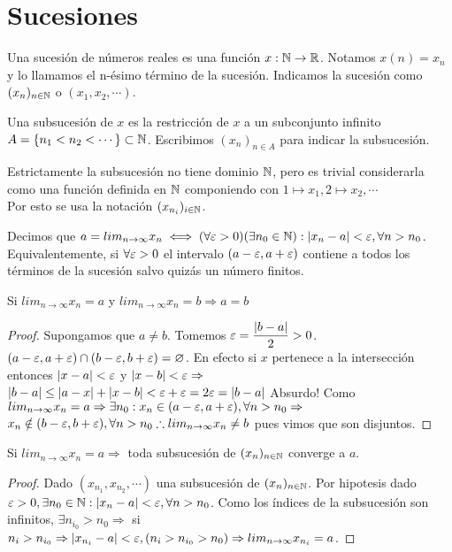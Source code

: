 \section{Sucesiones}

Una sucesión de números reales es una función $x: \mathbb{N} \to \mathbb{R}$. Notamos $x(n) = x_n$ y lo llamamos el n-ésimo término de la sucesión. Indicamos la sucesión como $(x_n)_{n \in \mathbb{N}}$ o $(x_1, x_2, \cdots)$.

Una subsucesión de $x$ es la restricción de $x$ a un subconjunto infinito $A = \{ n_1 < n_2 < \cdots \} \subset \mathbb{N}$. Escribimos $(x_n)_{n \in A}$ para indicar la subsucesión.

\begin{note}
  Estrictamente la subsucesión no tiene dominio $\mathbb{N}$, pero es trivial considerarla como una función definida en $\mathbb{N}$ componiendo con $1 \mapsto x_1, 2 \mapsto x_2, \cdots$ \\
  Por esto se usa la notación $(x_{n_i})_{i \in \mathbb{N}}$.
\end{note}

\begin{definition}
  Decimos que $a = lim_{n \to \infty} x_n \iff (\forall \varepsilon > 0)(\exists n_0 \in \mathbb{N}) : |x_n - a| < \varepsilon, \forall n > n_0$. \\
  Equivalentemente, si $\forall \varepsilon > 0$ el intervalo $(a-\varepsilon, a+\varepsilon)$ contiene a todos los términos de la sucesión salvo quizás un número finitos.
\end{definition}

\begin{theorem}
  Si $lim_{n \to \infty} x_n = a$ y $lim_{n \to \infty} x_n = b \Rightarrow a=b$
  \begin{proof}
    Supongamos que $a \neq b$. Tomemos $\varepsilon = \dfrac{|b-a|}{2} > 0$. \\
    $(a - \varepsilon, a+\varepsilon) \cap (b-\varepsilon, b+\varepsilon) = \varnothing$. En efecto si
    $x$ pertenece a la intersección entonces $|x-a| < \varepsilon$ y $|x-b| < \varepsilon \Rightarrow$ \\
    $|b-a| \leq |a-x| + |x-b| < \varepsilon + \varepsilon = 2 \varepsilon = |b-a|$ Absurdo!
    Como $lim_{n \to \infty} x_n = a \Rightarrow \exists n_0 : x_n \in (a - \varepsilon, a+ \varepsilon), \forall n > n_0 \Rightarrow$ \\
    $x_n \notin (b-\varepsilon, b+\varepsilon), \forall n > n_0 \therefore lim_{n \to \infty} x_n \neq b$ pues vimos que son disjuntos.
  \end{proof}
\end{theorem}

\begin{theorem}
  Si $lim_{n \to \infty} x_n = a \Rightarrow$ toda subsucesión de $(x_n)_{n \in \mathbb{N}}$ converge a $a$.

  \begin{proof}
    Dado $(x_{n_1}, x_{n_2}, \cdots)$ una subsucesión de $(x_n)_{n \in \mathbb{N}}$. Por hipotesis dado $\varepsilon > 0, \exists n_0 \in \mathbb{N} : |x_n - a| < \varepsilon, \forall n > n_0$. Como los índices de la subsucesión son infinitos, $\exists n_{i_0} > n_0 \Rightarrow$ si $n_i > n_{i_0} \Rightarrow |x_{n_i} - a| < \varepsilon, (n_i > n_{i_0} > n_0) \Rightarrow lim_{n \to \infty} x_{n_i} = a$.
  \end{proof}
\end{theorem}

